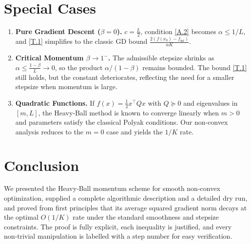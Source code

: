 \documentclass{article}
\begin{document}
\section*{Special Cases}
\begin{enumerate}[label=\alph*)]
\item \textbf{Pure Gradient Descent ($\beta=0$).}  
$c=\frac{L}{2}$, condition \eqref{A.2} becomes $\alpha\le 1/L$, and
\eqref{T.1} simplifies to the classic GD bound
$\frac{2(f(x_0)-f_{\inf})}{\alpha K}$.

\item \textbf{Critical Momentum $\beta\to 1^{-}$.}  
The admissible stepsize shrinks as $\alpha\le \frac{1-\beta}{L}\to0$,
so the product $\alpha/(1-\beta)$ remains bounded. The bound
\eqref{T.1} still holds, but the constant deteriorates, reflecting the
need for a smaller stepsize when momentum is large.

\item \textbf{Quadratic Functions.}  
If $f(x)=\frac{1}{2}x^\top Q x$ with $Q\succeq0$ and eigenvalues in $[m,L]$,
the Heavy‑Ball method is known to converge linearly when $m>0$ and
parameters satisfy the classical Polyak conditions.
Our non‑convex analysis reduces to the $m=0$ case and yields the
$1/K$ rate.
\end{enumerate}

\section*{Conclusion}
We presented the Heavy‑Ball momentum scheme for smooth non‑convex
optimization, supplied a complete algorithmic description and a detailed
dry run, and proved from first principles that its average squared
gradient norm decays at the optimal $O(1/K)$ rate under the standard
smoothness and stepsize constraints. The proof is fully explicit, each
inequality is justified, and every non‑trivial manipulation is labelled
with a step number for easy verification.
\end{document}
